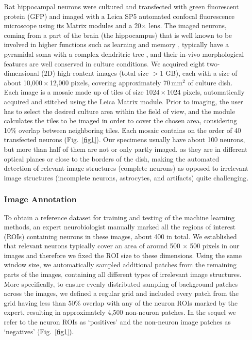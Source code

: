 Rat hippocampal neurons were cultured and transfected with green fluorescent protein (GFP) and imaged with a Leica SP5 automated confocal fluorescence microscope using its Matrix modules and a 20$\times$ lens. The imaged neurons, coming from a part of the brain (the hippocampus) that is well known to be involved in higher functions such as learning and memory \cite{squire1992memory}, typically have a pyramidal soma with a complex dendritric tree \cite{goslin1998rat}, and their in-vivo morphological features are well conserved in culture conditions. We acquired eight two-dimensional (2D) high-content images (total size $>$1 GB), each with a size of about 10,000\,$\times$\,12,000 pixels, covering approximately 70\,mm${}^2$ of culture dish. Each image is a mosaic made up of tiles of size 1024\,$\times$\,1024 pixels, automatically acquired and stitched using the Leica Matrix module. Prior to imaging, the user has to select the desired culture area within the field of view, and the module calculates the tiles to be imaged in order to cover the chosen area, considering 10\% overlap between neighboring tiles. Each mosaic contains on the order of 40 transfected neurons (Fig.\ \ref{fig1}). Our specimens usually have about 100 neurons, but more than half of them are not or only partly imaged, as they are in different optical planes or close to the borders of the dish, making the automated detection of relevant image structures (complete neurons) as opposed to irrelevant image structures (incomplete neurons, astrocytes, and artifacts) quite challenging.

\subsubsection{Image Annotation}
\label{sec:annotation}

To obtain a reference dataset for training and testing of the machine learning methods, an expert neurobiologist manually marked all the regions of interest (ROIs) containing neurons in these images, about 400 in total. We established that relevant neurons typically cover an area of around 500 $\times$ 500 pixels in our images and therefore we fixed the ROI size to these dimensions. Using the same window size, we automatically sampled additional patches from the remaining parts of the images, containing all different types of irrelevant image structures. More specifically, to ensure evenly distributed sampling of background patches across the images, we defined a regular grid and included every patch from the grid having less than 50\% overlap with any of the neuron ROIs marked by the expert, resulting in approximately 4,500 non-neuron patches. In the sequel we refer to the neuron ROIs as `positives' and the non-neuron image patches as `negatives' (Fig.~\ref{fig1}).

